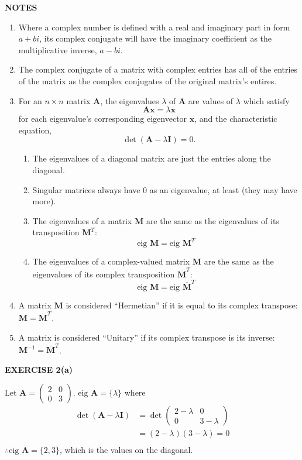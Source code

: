 \documentclass[12pt]{article}
\newcommand{\mat}[1]{\mathbf{#1}}
\newcommand{\exercise}[1]{\textbf{EXERCISE #1}\label{#1}}
\newcommand{\notes}{\textbf{NOTES}}
\newcommand{\eig}{\text{eig }}
\begin{document}
\notes

\begin{enumerate}
\item Where a complex number is defined with a real and imaginary part in form $a + bi$, its complex conjugate will have the imaginary coefficient as the multiplicative inverse, $a - bi$.
\item The complex conjugate of a matrix with complex entries has all of the entries of the matrix as the complex conjugates of the original matrix's entires.
\item For an $n \times n$ matrix $\mat{A}$, the eigenvalues $\lambda$ of $\mat{A}$ are values of $\lambda$ which satisfy 
\begin{equation}
\mat{Ax} = \lambda \mat{x}
\end{equation}
for each eigenvalue's corresponding eigenvector $\mat{x}$, and the characteristic equation,
\begin{equation}
\det ( \mat{A} - \lambda \mat{I} ) = 0.
\end{equation}
\begin{enumerate}
\item The eigenvalues of a diagonal matrix are just the entries along the diagonal.
\item Singular matrices always have 0 as an eigenvalue, at least (they may have more).
\item The eigenvalues of a matrix $\mat{M}$ are the same as the eigenvalues of its transposition $\mat{M}^{T}$:
\begin{equation}
\eig \mat{M} = \eig \mat{M}^{T}
\end{equation}
\item The eigenvalues of a complex-valued matrix $\mat{M}$ are the same as the eigenvalues of its complex transposition $\overline{\mat{M}}^{T}$:
\begin{equation}
\eig \mat{M} = \eig \mat{\overline{M}}^{T}
\end{equation}
\end{enumerate}
\item A matrix $\mat{M}$ is considered ``Hermetian'' if it is equal to its complex transpose: $\mat{M} = \mat{\overline{M}}^{T}$.
\item A matrix is considered ``Unitary'' if its complex transpose is its inverse: $\mat{M}^{-1} = \mat{\overline{M}}^{T}$.
\end{enumerate}

\exercise{2(a)}

Let $\mat{A} = \begin{pmatrix} 2 & 0 \\ 0 & 3 \end{pmatrix}$. $\eig \mat{A} = \{ \lambda \}$ where
\begin{align*}
\det(\mat{A} - \lambda \mat{I}) 
&= \det \begin{pmatrix} 2 - \lambda & 0 \\ 0 & 3 - \lambda \end{pmatrix} \\
&= (2-\lambda)(3-\lambda) = 0 \\
\end{align*}
$\therefore \eig \mat{A} = \{ 2,3 \}$, which is the values on the diagonal.
\end{document}

